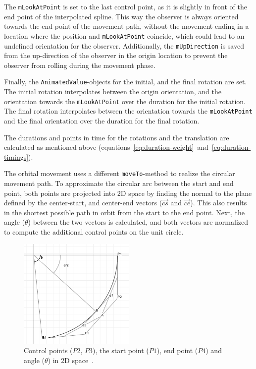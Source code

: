 The \texttt{mLookAtPoint} is set to the last control point, as it is slightly in front of the end point of the
interpolated spline.
This way the observer is always oriented towards the end point of the movement path, without the movement ending in a
location where the position and \texttt{mLookAtPoint} coincide, which could lead to an undefined orientation
for the observer.
Additionally, the \texttt{mUpDirection} is saved from the up-direction of the observer in the origin location to
prevent the observer from rolling during the movement phase.

Finally, the \texttt{AnimatedValue}-objects for the initial, and the final rotation are set.
The initial rotation interpolates between the origin orientation, and the orientation towards the
\texttt{mLookAtPoint} over the duration for the initial rotation.
The final rotation interpolates between the orientation towards the \texttt{mLookAtPoint} and the final
orientation over the duration for the final rotation.

The durations and points in time for the rotations and the translation are calculated as mentioned above
(equations~\ref{eq:duration-weight}~and~\ref{eq:duration-timings}).

The orbital movement uses a different \texttt{moveTo}-method to realize the circular movement path.
To approximate the circular arc between the start and end point, both points are projected into 2D space by finding
the normal to the plane defined by the center-start, and center-end vectors ($\overrightarrow{cs}$ and
$\overrightarrow{ce}$).
This also results in the shortest possible path in orbit from the start to the end point.
Next, the angle ($\theta$) between the two vectors is calculated, and both vectors are normalized to compute the
additional control points on the unit circle.

\begin{figure}[h]
    \centering
    \includegraphics[width=0.5\textwidth]{content/4_3_autoNavigation/img/CircularCurveParameters}
    \caption{Control points ($P2$, $P3$), the start point ($P1$), end point ($P4$) and angle ($\theta$) in 2D
    space~\cite{Poxmax2021}.}
    \label{fig:orbital-control-points}
\end{figure}

